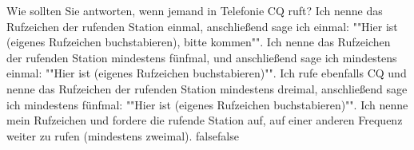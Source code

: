     {Wie sollten Sie antworten, wenn jemand in Telefonie CQ ruft?}
    {Ich nenne das Rufzeichen der rufenden Station einmal, anschließend sage ich einmal: ""Hier ist (eigenes Rufzeichen buchstabieren), bitte kommen"".}
    {Ich nenne das Rufzeichen der rufenden Station mindestens fünfmal, und anschließend sage ich mindestens einmal: ""Hier ist (eigenes Rufzeichen buchstabieren)"".}
    {Ich rufe ebenfalls CQ und nenne das Rufzeichen der rufenden Station mindestens dreimal, anschließend sage ich mindestens fünfmal: ""Hier ist (eigenes Rufzeichen buchstabieren)"".}
    {Ich nenne mein Rufzeichen und fordere die rufende Station auf, auf einer anderen Frequenz weiter zu rufen (mindestens zweimal).}
    {false}{false}